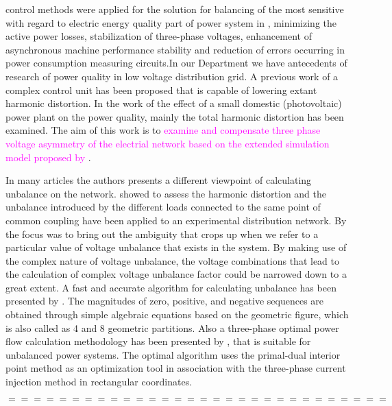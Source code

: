 control methods were applied for the solution for balancing of the most sensitive with regard to electric energy quality part of power system in \cite{uimethod},  minimizing the active power losses, stabilization of three-phase voltages, enhancement of asynchronous machine performance stability and reduction of errors occurring in power consumption measuring circuits.In our Department we have antecedents of research of power quality in low voltage  distribution grid. A previous work of \cite{gorbe2012reduction} a complex control unit has been proposed that is capable of lowering extant harmonic distortion. In the work of \cite{Gorbe2014experimental} the effect of a small domestic (photovoltaic) power plant on the power quality, mainly the total harmonic distortion has been examined. The aim of this work is to \textcolor{magenta}{examine and compensate three phase voltage asymmetry of the electrial network based on the extended simulation model proposed by \cite{gorbe2012reduction}}.

    In many articles the authors presents a different viewpoint of calculating unbalance on the network. \cite{martin2015unbalance} showed to assess the harmonic distortion and the unbalance introduced by the different loads connected to the same point of common coupling have been applied to an experimental distribution network.  By \cite{kini2007novel} the focus was to bring out the ambiguity that crops up when we refer to a particular value of voltage unbalance that exists in the system. By making use of the complex nature of voltage unbalance, the voltage combinations that lead to the calculation of complex voltage unbalance factor could be narrowed down to a great extent. A fast and accurate algorithm for calculating unbalance has been presented by \cite{wen2014approximate}. The magnitudes of zero, positive, and negative sequences are obtained through simple algebraic equations based on the geometric figure, which is also called as 4 and 8 geometric partitions. Also a three-phase optimal power flow calculation methodology has been presented by \cite{araujo2013three}, that is suitable for unbalanced power systems. The optimal algorithm uses the primal-dual interior point method as an optimization tool in association with the three-phase current injection method in rectangular coordinates.%
    
    $$ ============================== $$
    
